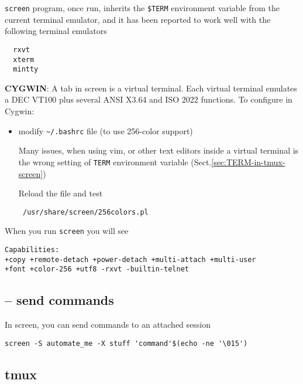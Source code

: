 \verb!screen! program, once run, inherits the \verb!$TERM! environment variable
from the current terminal emulator, and it has been reported to work well with
the following terminal emulators
\begin{verbatim}
  rxvt
  xterm
  mintty
\end{verbatim}


{\bf CYGWIN}: A tab in screen is a virtual terminal. Each virtual terminal
emulates a DEC VT100 plus several ANSI X3.64 and ISO 2022 functions. To
configure in Cygwin:

\begin{itemize}

  \item modify \verb!~/.bashrc! file (to use 256-color support)

Many issues, when using vim, or other text editors inside a virtual terminal is
the wrong setting of \verb!TERM! environment variable (Sect.\ref{sec:TERM-in-tmux-screen})

Reload the file and test
\begin{verbatim}
 /usr/share/screen/256colors.pl
\end{verbatim}
\end{itemize}

\begin{mdframed}

When you run \verb!screen! you will see

{\tiny
\begin{verbatim}
Capabilities:
+copy +remote-detach +power-detach +multi-attach +multi-user 
+font +color-256 +utf8 -rxvt -builtin-telnet
\end{verbatim}
}

\end{mdframed}


\subsection{-- send commands}

In screen, you can send commands to an attached session
\begin{verbatim}
screen -S automate_me -X stuff 'command'$(echo -ne '\015')
\end{verbatim}


\subsection{tmux}
\label{sec:tmux} 

